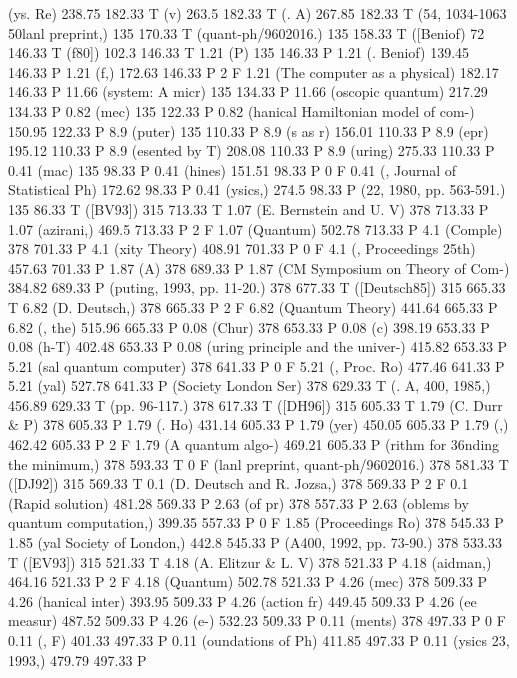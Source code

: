 (ys. Re) 238.75 182.33 T
(v) 263.5 182.33 T
(. A) 267.85 182.33 T
(54, 1034-1063 \050lanl preprint,) 135 170.33 T
(quant-ph/9602016.) 135 158.33 T
([Beniof) 72 146.33 T
(f80]) 102.3 146.33 T
1.21 (P) 135 146.33 P
1.21 (. Beniof) 139.45 146.33 P
1.21 (f,) 172.63 146.33 P
2 F
1.21 (The computer as a physical) 182.17 146.33 P
11.66 (system: A micr) 135 134.33 P
11.66 (oscopic quantum) 217.29 134.33 P
0.82 (mec) 135 122.33 P
0.82 (hanical Hamiltonian model of com-) 150.95 122.33 P
8.9 (puter) 135 110.33 P
8.9 (s as r) 156.01 110.33 P
8.9 (epr) 195.12 110.33 P
8.9 (esented by T) 208.08 110.33 P
8.9 (uring) 275.33 110.33 P
0.41 (mac) 135 98.33 P
0.41 (hines) 151.51 98.33 P
0 F
0.41 (, Journal of Statistical Ph) 172.62 98.33 P
0.41 (ysics,) 274.5 98.33 P
(22, 1980, pp. 563-591.) 135 86.33 T
([BV93]) 315 713.33 T
1.07 (E. Bernstein and U. V) 378 713.33 P
1.07 (azirani,) 469.5 713.33 P
2 F
1.07 (Quantum) 502.78 713.33 P
4.1 (Comple) 378 701.33 P
4.1 (xity Theory) 408.91 701.33 P
0 F
4.1 (, Proceedings 25th) 457.63 701.33 P
1.87 (A) 378 689.33 P
1.87 (CM Symposium on Theory of Com-) 384.82 689.33 P
(puting, 1993, pp. 11-20.) 378 677.33 T
([Deutsch85]) 315 665.33 T
6.82 (D. Deutsch,) 378 665.33 P
2 F
6.82 (Quantum Theory) 441.64 665.33 P
6.82 (, the) 515.96 665.33 P
0.08 (Chur) 378 653.33 P
0.08 (c) 398.19 653.33 P
0.08 (h-T) 402.48 653.33 P
0.08 (uring principle and the univer-) 415.82 653.33 P
5.21 (sal quantum computer) 378 641.33 P
0 F
5.21 (, Proc. Ro) 477.46 641.33 P
5.21 (yal) 527.78 641.33 P
(Society London Ser) 378 629.33 T
(. A, 400, 1985,) 456.89 629.33 T
(pp. 96-117.) 378 617.33 T
([DH96]) 315 605.33 T
1.79 (C. Durr & P) 378 605.33 P
1.79 (. Ho) 431.14 605.33 P
1.79 (yer) 450.05 605.33 P
1.79 (,) 462.42 605.33 P
2 F
1.79 (A quantum algo-) 469.21 605.33 P
(rithm for \336nding the minimum,) 378 593.33 T
0 F
(lanl preprint, quant-ph/9602016.) 378 581.33 T
([DJ92]) 315 569.33 T
0.1 (D. Deutsch and R. Jozsa,) 378 569.33 P
2 F
0.1 (Rapid solution) 481.28 569.33 P
2.63 (of pr) 378 557.33 P
2.63 (oblems by quantum computation,) 399.35 557.33 P
0 F
1.85 (Proceedings Ro) 378 545.33 P
1.85 (yal Society of London,) 442.8 545.33 P
(A400, 1992, pp. 73-90.) 378 533.33 T
([EV93]) 315 521.33 T
4.18 (A. Elitzur & L. V) 378 521.33 P
4.18 (aidman,) 464.16 521.33 P
2 F
4.18 (Quantum) 502.78 521.33 P
4.26 (mec) 378 509.33 P
4.26 (hanical inter) 393.95 509.33 P
4.26 (action fr) 449.45 509.33 P
4.26 (ee measur) 487.52 509.33 P
4.26 (e-) 532.23 509.33 P
0.11 (ments) 378 497.33 P
0 F
0.11 (, F) 401.33 497.33 P
0.11 (oundations of Ph) 411.85 497.33 P
0.11 (ysics 23, 1993,) 479.79 497.33 P

